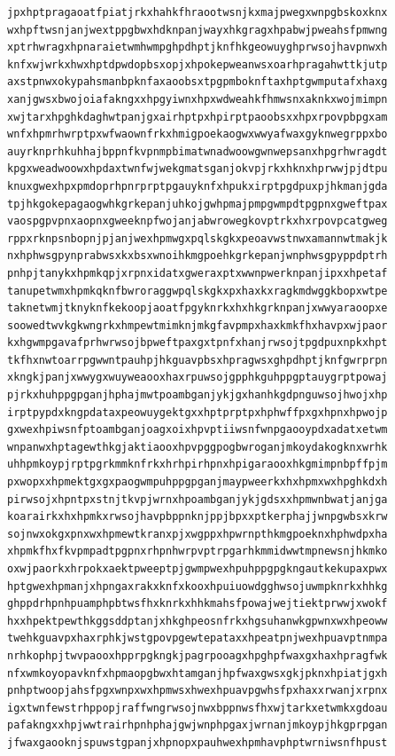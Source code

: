 \documentclass[11pt,letterpaper]{exam}
\begin{document}
\begin{questions}
\begin{verbatim}
jpxhptpragaoatfpiatjrkxhahkfhraootwsnjkxmajpwegxwnpgbskoxknx
wxhpftwsnjanjwextppgbwxhdknpanjwayxhkgragxhpabwjpweahsfpmwng
xptrhwragxhpnaraietwmhwmpghpdhptjknfhkgeowuyghprwsojhavpnwxh
knfxwjwrkxhwxhptdpwdopbsxopjxhpokepweanwsxoarhpragahwttkjutp
axstpnwxokypahsmanbpknfaxaoobsxtpgpmboknftaxhptgwmputafxhaxg
xanjgwsxbwojoiafakngxxhpgyiwnxhpxwdweahkfhmwsnxaknkxwojmimpn
xwjtarxhpghkdaghwtpanjgxairhptpxhpirptpaoobsxxhpxrpovpbpgxam
wnfxhpmrhwrptpxwfwaownfrkxhmigpoekaogwxwwyafwaxgyknwegrppxbo
auyrknprhkuhhajbppnfkvpnmpbimatwnadwoowgwnwepsanxhpgrhwragdt
kpgxweadwoowxhpdaxtwnfwjwekgmatsganjokvpjrkxhknxhprwwjpjdtpu
knuxgwexhpxpmdoprhpnrprptpgauyknfxhpukxirptpgdpuxpjhkmanjgda
tpjhkgokepagaogwhkgrkepanjuhkojgwhpmajpmpgwmpdtpgpnxgweftpax
vaospgpvpnxaopnxgweeknpfwojanjabwrowegkovptrkxhxrpovpcatgweg
rppxrknpsnbopnjpjanjwexhpmwgxpqlskgkxpeoavwstnwxamannwtmakjk
nxhphwsgpynprabwsxkxbsxwnoihkmgpoehkgrkepanjwnphwsgpyppdptrh
pnhpjtanykxhpmkqpjxrpnxidatxgweraxptxwwnpwerknpanjipxxhpetaf
tanupetwmxhpmkqknfbwroraggwpqlskgkxpxhaxkxragkmdwggkbopxwtpe
taknetwmjtknyknfkekoopjaoatfpgyknrkxhxhkgrknpanjxwwyaraoopxe
soowedtwvkgkwngrkxhmpewtmimknjmkgfavpmpxhaxkmkfhxhavpxwjpaor
kxhgwmpgavafprhwrwsojbpweftpaxgxtpnfxhanjrwsojtpgdpuxnpkxhpt
tkfhxnwtoarrpgwwntpauhpjhkguavpbsxhpragwsxghpdhptjknfgwrprpn
xkngkjpanjxwwygxwuyweaooxhaxrpuwsojgpphkguhppgptauygrptpowaj
pjrkxhuhppgpganjhphajmwtpoambganjykjgxhanhkgdpnguwsojhwojxhp
irptpypdxkngpdataxpeowuygektgxxhptprptpxhphwffpxgxhpnxhpwojp
gxwexhpiwsnfptoambganjoagxoixhpvptiiwsnfwnpgaooypdxadatxetwm
wnpanwxhptagewthkgjaktiaooxhpvpggpogbwroganjmkoydakogknxwrhk
uhhpmkoypjrptpgrkmmknfrkxhrhpirhpnxhpigaraooxhkgmimpnbpffpjm
pxwopxxhpmektgxgxpaogwmpuhppgpganjmaypweerkxhxhpmxwxhpghkdxh
pirwsojxhpntpxstnjtkvpjwrnxhpoambganjykjgdsxxhpmwnbwatjanjga
koarairkxhxhpmkxrwsojhavpbppnknjppjbpxxptkerphajjwnpgwbsxkrw
sojnwxokgxpnxwxhpmewtkranxpjxwgppxhpwrnpthkmgpoeknxhphwdpxha
xhpmkfhxfkvpmpadtpgpnxrhpnhwrpvptrpgarhkmmidwwtmpnewsnjhkmko
oxwjpaorkxhrpokxaektpweeptpjgwmpwexhpuhppgpgkngautkekupaxpwx
hptgwexhpmanjxhpngaxrakxknfxkooxhpuiuowdgghwsojuwmpknrkxhhkg
ghppdrhpnhpuamphpbtwsfhxknrkxhhkmahsfpowajwejtiektprwwjxwokf
hxxhpektpewthkggsddptanjxhkghpeosnfrkxhgsuhanwkgpwnxwxhpeoww
twehkguavpxhaxrphkjwstgpovpgewtepataxxhpeatpnjwexhpuavptnmpa
nrhkophpjtwvpaooxhpprpgkngkjpagrpooagxhpghpfwaxgxhaxhpragfwk
nfxwmkoyopavknfxhpmaopgbwxhtamganjhpfwaxgwsxgkjpknxhpiatjgxh
pnhptwoopjahsfpgxwnpxwxhpmwsxhwexhpuavpgwhsfpxhaxxrwanjxrpnx
igxtwnfewstrhppopjraffwngrwsojnwxbppnwsfhxwjtarkxetwmkxgdoau
pafakngxxhpjwwtrairhpnhphajgwjwnphpgaxjwrnanjmkoypjhkgprpgan
jfwaxgaooknjspuwstgpanjxhpnopxpauhwexhpmhavphptwrniwsnfhpust

\end{verbatim}
\end{questions}
\end{document}
